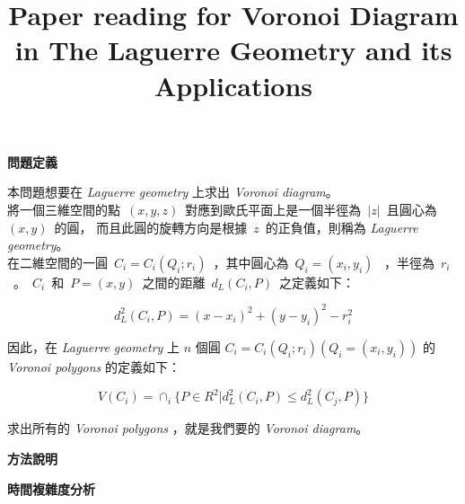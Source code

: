 \documentclass[12pt]{article}
\title{\bf{Paper reading for Voronoi Diagram in The Laguerre Geometry and its Applications}}
\date{}
\begin{document}
\maketitle

\begin{CJK}{UTF8}{bkai}

\centerline{\bf 問題定義}

本問題想要在 {\it Laguerre geometry} 上求出 {\it Voronoi diagram}。\\

將一個三維空間的點~$(x,y,z)$~對應到歐氏平面上是一個半徑為~$|z|$~且圓心為~$(x,y)$~的圓，
而且此圓的旋轉方向是根據~$z$~的正負值，則稱為 {\it Laguerre geometry}。\\

在二維空間的一圓~$C_i=C_i(Q_i;r_i)$~，其中圓心為~$Q_i=(x_i,y_i)$~
，半徑為~$r_i$~。~$C_i$~和~$P=(x,y)$~之間的距離~$d_L(C_i,P)$~之定義如下：

\begin{equation}
d_L^2(C_i,P)=(x-x_i)^2+(y-y_i)^2-r_i^2
\end{equation}

因此，在 {\it Laguerre geometry} 上 $n$ 個圓 $C_i=C_i(Q_i;r_i)(Q_i=(x_i,y_i))$ 的 {\it Voronoi polygons} 的定義如下：

\begin{equation}
V(C_i)=\cap_i \{P \in R^2 | d_L^2(C_i,P) \leq d_L^2(C_j,P) \}
\end{equation}

求出所有的 {\it Voronoi polygons} ，就是我們要的 {\it Voronoi diagram}。\\


\centerline{\bf 方法說明}

\centerline{\bf 時間複雜度分析}

\end{CJK}
\end{document}
